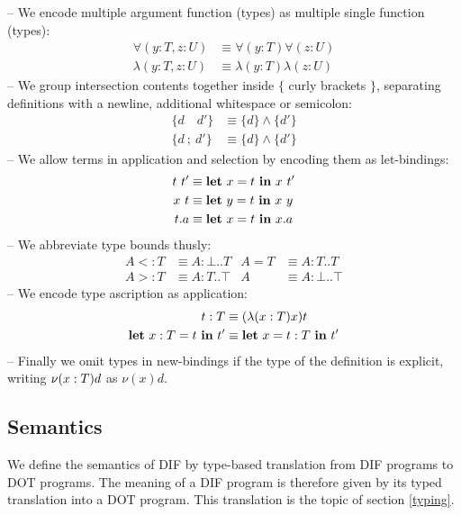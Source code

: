 \noindent -- We encode multiple argument function (types) as multiple single
function (types):
\begin{align*}
    \forall(y: T, z: U) &\equiv \forall(y: T)\forall(z: U) \\
    \lambda(y: T, z: U) &\equiv \lambda(y: T)\lambda(z: U)
\end{align*}
\noindent -- We group intersection contents together inside $\{$ curly brackets
$\}$, separating definitions with a newline, additional whitespace or semicolon:
\begin{align*}
    \{d \quad d'\} &\equiv \{d\} \wedge \{d'\} \\
    \{d \ ;\  d'\} &\equiv \{d\} \wedge \{d'\}
\end{align*}
\noindent -- We allow terms in application and selection by encoding them as
let-bindings:
\begin{align*}
    t\ t' &\equiv \textbf{let}\ x = t\ \textbf{in}\ x\ t' \\
    x\ t &\equiv \textbf{let}\ y = t\ \textbf{in}\ x\ y \\
    t.a &\equiv \textbf{let}\ x = t\ \textbf{in}\ x.a
\end{align*}
\noindent -- We abbreviate type bounds thusly:
\begin{align*}
    A <: T &\equiv A: \bot..T & A = T &\equiv A: T..T \\
    A >: T &\equiv A: T..\top & A &\equiv A: \bot..\top
\end{align*}
\noindent -- We encode type ascription as application:
\begin{align*}
    t: T &\equiv (\lambda(x:T)x)t \\
    \textbf{let}\ x: T = t\ \textbf{in}\ t' &\equiv \textbf{let}\ x = t: T\ \textbf{in}\ t'
\end{align*}
\noindent -- Finally we omit types in new-bindings if the type of the definition
is explicit, writing $\nu(x:T)d$ as $\nu(x)d$.

\subsection{Semantics}
We define the semantics of DIF by type-based translation from DIF programs to
DOT programs. The meaning of a DIF program is therefore given by its typed
translation into a DOT program. This translation is the topic of section
\ref{typing}.
